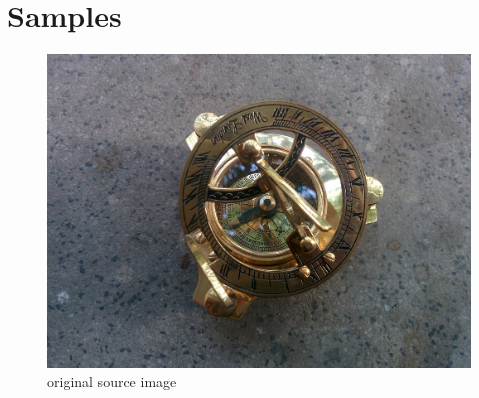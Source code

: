 \documentclass[15pt]{article}
\begin{document}
\section{Samples}
\begin{figure}[h!]
\includegraphics[width=1\linewidth]{original.jpg}
\caption{original source image}
\end{figure}
\end{document}
